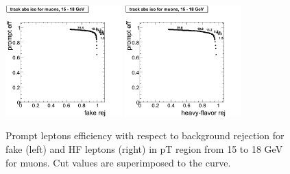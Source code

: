 \begin{figure}[htbp]
\begin{center}
 \includegraphics[width = 0.4\textwidth]{pictures/bkgdRej_sigEff/onlyTrack_muon_fake_ptCut4_ptCut5.png}
\includegraphics[width = 0.4\textwidth]{pictures/bkgdRej_sigEff/onlyTrack_muon_nonPrompt_ptCut4_ptCut5.png}
\caption{\small{Prompt leptons efficiency with respect to background 
rejection for fake (left) and HF leptons (right) in pT region
from 15 to 18 GeV for muons. 
Cut values are superimposed to the curve.}\label{fig:rej_mu5}}
\end{center}
\end{figure}

